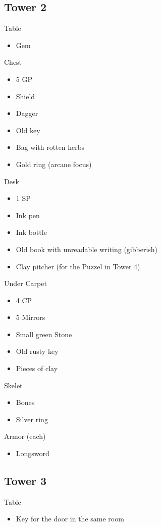 \documentclass[a4paper,10pt,twoside,twocolumn,bg=print]{dndbook} %
\begin{document}
		\subsection{Tower 2}
			{\Large Table}
				\begin{itemize}
					\item Gem
				\end{itemize}
			{\Large Chest}
				\begin{itemize}
					\item 5 GP
					\item Shield
					\item Dagger
					\item Old key
					\item Bag with rotten herbs
					\item Gold ring (arcane focus)
				\end{itemize}
			{\Large Desk}
				\begin{itemize}
					\item 1 SP
					\item Ink pen
					\item Ink bottle
					\item Old book with unreadable writing (gibberish)
					\item Clay pitcher (for the Puzzel in Tower 4)
				\end{itemize}
			{\Large Under Carpet}
				\begin{itemize}
					\item 4 CP
					\item 5 Mirrors
					\item Small green Stone
					\item Old rusty key
					\item Pieces of clay
				\end{itemize}
			{\Large Skelet}
				\begin{itemize}
					\item Bones
					\item Silver ring
				\end{itemize}
			{\Large Armor (each)}
				\begin{itemize}
					\item Longsword
				\end{itemize}
		\subsection{Tower 3}
			{\Large Table}
				\begin{itemize}
					\item Key for the door in the same room
				\end{itemize}
\end{document}
